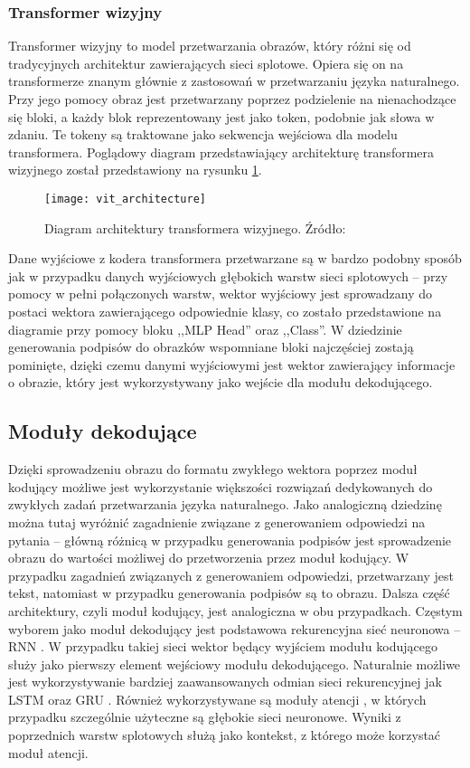 \subsubsection{Transformer wizyjny}
Transformer wizyjny \cite{vit} to model przetwarzania obrazów, który różni się od tradycyjnych architektur zawierających sieci splotowe. Opiera się on na transformerze znanym głównie z zastosowań w przetwarzaniu języka naturalnego. Przy jego pomocy obraz jest przetwarzany poprzez podzielenie na nienachodzące się bloki, a każdy blok reprezentowany jest jako token, podobnie jak słowa w zdaniu. Te tokeny są traktowane jako sekwencja wejściowa dla modelu transformera. Poglądowy diagram przedstawiający architekturę transformera wizyjnego został przedstawiony na rysunku \ref{fig:vit-architecture}.
\begin{figure}[H]
  \centering
  \texttt{[image: vit\_architecture]}
  \caption{Diagram architektury transformera wizyjnego. Źródło: \cite{vit}}
  \label{fig:vit-architecture}
\end{figure}
\noindent Dane wyjściowe z kodera transformera przetwarzane są w bardzo podobny sposób jak w przypadku danych wyjściowych głębokich warstw sieci splotowych -- przy pomocy w pełni połączonych warstw, wektor wyjściowy jest sprowadzany do postaci wektora zawierającego odpowiednie klasy, co zostało przedstawione na diagramie przy pomocy bloku ,,MLP Head'' oraz ,,Class''. W dziedzinie generowania podpisów do obrazków wspomniane bloki najczęściej zostają pominięte, dzięki czemu danymi wyjściowymi jest wektor zawierający informacje o obrazie, który jest wykorzystywany jako wejście dla modułu dekodującego.
\subsection{Moduły dekodujące}
Dzięki sprowadzeniu obrazu do formatu zwykłego wektora poprzez moduł kodujący możliwe jest wykorzystanie większości rozwiązań dedykowanych do zwykłych zadań przetwarzania języka naturalnego. Jako analogiczną dziedzinę można tutaj wyróżnić zagadnienie związane z generowaniem odpowiedzi na pytania -- główną różnicą w przypadku generowania podpisów jest sprowadzenie obrazu do wartości możliwej do przetworzenia przez moduł kodujący. W przypadku zagadnień związanych z generowaniem odpowiedzi, przetwarzany jest tekst, natomiast w przypadku generowania podpisów są to obrazu. Dalsza część architektury, czyli moduł kodujący, jest analogiczna w obu przypadkach. Częstym wyborem jako moduł dekodujący jest podstawowa rekurencyjna sieć neuronowa -- RNN \cite{rnn}. W przypadku takiej sieci wektor będący wyjściem modułu kodującego służy jako pierwszy element wejściowy modułu dekodującego. Naturalnie możliwe jest wykorzystywanie bardziej zaawansowanych odmian sieci rekurencyjnej jak LSTM \cite{lstm} oraz GRU \cite{gru}. Również wykorzystywane są moduły atencji \cite{attention} \cite{attentionImageCaptioning}, w których przypadku szczególnie użyteczne są głębokie sieci neuronowe. Wyniki z poprzednich warstw splotowych służą jako kontekst, z którego może korzystać moduł atencji.

